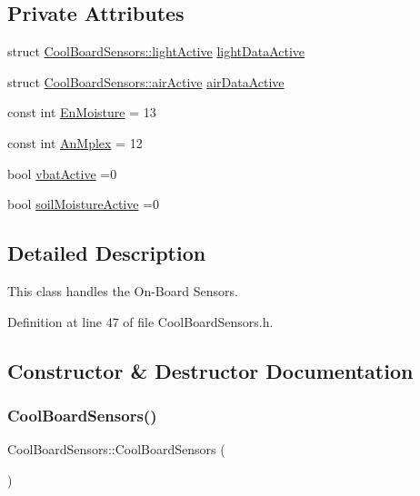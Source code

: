 \subsection*{Private Attributes}
\begin{DoxyCompactItemize}
\item 
struct \hyperlink{struct_cool_board_sensors_1_1light_active}{Cool\+Board\+Sensors\+::light\+Active} \hyperlink{class_cool_board_sensors_ac4deb1cf41bac8b91c780c92fab00ba4}{light\+Data\+Active}
\item 
struct \hyperlink{struct_cool_board_sensors_1_1air_active}{Cool\+Board\+Sensors\+::air\+Active} \hyperlink{class_cool_board_sensors_abff8dfeccb2f7689847bb64d5f1cd31e}{air\+Data\+Active}
\item 
const int \hyperlink{class_cool_board_sensors_a6177d02e14a057a2f171a2e930b5038d}{En\+Moisture} = 13
\item 
const int \hyperlink{class_cool_board_sensors_a12ef28b1046219e0aee10bf64e28c4a5}{An\+Mplex} = 12
\item 
bool \hyperlink{class_cool_board_sensors_ab0b4bbae83796b52b90f91008d383583}{vbat\+Active} =0
\item 
bool \hyperlink{class_cool_board_sensors_ae7971bf527781ac4994309591b78ab89}{soil\+Moisture\+Active} =0
\end{DoxyCompactItemize}


\subsection{Detailed Description}
This class handles the On-\/\+Board Sensors. 

Definition at line 47 of file Cool\+Board\+Sensors.\+h.



\subsection{Constructor \& Destructor Documentation}
\mbox{\label{class_cool_board_sensors_a91ff2a02f5486f90cf2413a1cf8a9ed4}} 
\subsubsection{\texorpdfstring{Cool\+Board\+Sensors()}{CoolBoardSensors()}}
{\footnotesize\ttfamily Cool\+Board\+Sensors\+::\+Cool\+Board\+Sensors (\begin{DoxyParamCaption}{ }\end{DoxyParamCaption})}

